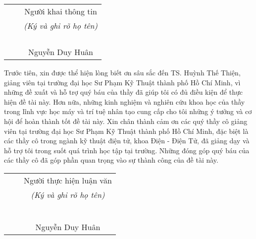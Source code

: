 \documentclass[a4paper, oneside]{book}
\begin{document}
\begin{background}
\begin{table}[!h]
\centering
\begin{tabular}{p{3cm} p{3cm} p{3cm} p{3cm}}
&  & \multicolumn{2}{c}{Người khai thông tin} \\
&  & \multicolumn{2}{c}{\textit{(Ký và ghi rõ họ tên)}} \\
&  &             &            \\
&  &             &            \\
&  &             &            \\
&  &             &            \\
&  & \multicolumn{2}{c}{Nguyễn Duy Huân}
\end{tabular}
\end{table}
\end{background}

\begin{acknowledgments}

Trước tiên, xin được thể hiện lòng biết ơn sâu sắc đến TS. Huỳnh Thế Thiện, giảng viên tại trường đại học Sư Phạm Kỹ Thuật thành phố Hồ Chí Minh, vì những đề xuất và hỗ trợ quý báu của thầy đã giúp tôi có đủ điều kiện để thực hiện đề tài này. Hơn nữa, những kinh nghiệm và nghiên cứu khoa học của thầy trong lĩnh vực học máy và trí tuệ nhân tạo cung cấp cho tôi những ý tưởng và cơ hội để hoàn thành tốt đề tài này. Xin chân thành cảm ơn các quý thầy cô giảng viên tại trường đại học Sư Phạm Kỹ Thuật thành phố Hồ Chí Minh, đặc biệt là các thầy cô trong ngành kỹ thuật điện tử, khoa Điện - Điện Tử, đã giảng dạy và hỗ trợ tôi trong suốt quá trình học tập tại trường. Những đóng góp quý báu của các thầy cô đã góp phần quan trọng vào sự thành công của đề tài này.
\\
\begin{table}[!h]
\centering
\begin{tabular}{p{3cm} p{3cm} p{3cm} p{3cm}}
&  & \multicolumn{2}{c}{Người thực hiện luận văn} \\
&  & \multicolumn{2}{c}{\textit{(Ký và ghi rõ họ tên)}} \\
&  &             &            \\
&  &             &            \\
&  &             &            \\
&  &             &            \\
&  &             &            \\
&  &             &            \\
&  & \multicolumn{2}{c}{Nguyễn Duy Huân}
\end{tabular}
\end{table}
\end{acknowledgments}
\end{document}
